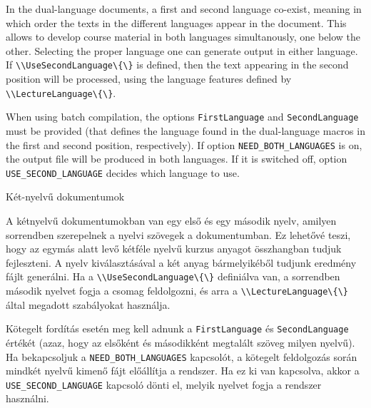 {

In the dual-language documents, a first and second language co-exist,
meaning in which order the texts in the different languages appear in the document. This allows to develop course material in both languages simultanously, one below the other. Selecting the proper language
one can generate output in either language.
If \lstinline|\\UseSecondLanguage\{\}| is defined, then the text appearing in the second position will be processed, using the 
language features defined by \lstinline|\\LectureLanguage\{\}|.

When using batch compilation, the options  \lstinline|FirstLanguage| and
\lstinline|SecondLanguage| must be provided (that defines the language
 found in the dual-language macros in the first and second position, respectively). If option \lstinline|NEED_BOTH_LANGUAGES| is on,
 the output file will be produced in both languages.
 If it is switched off, option \lstinline|USE_SECOND_LANGUAGE| decides
 which language to use.
}
{Két-nyelvű dokumentumok}
{
A kétnyelvű dokumentumokban van egy első és egy második nyelv,
amilyen sorrendben szerepelnek a nyelvi szövegek a dokumentumban.
Ez lehetővé teszi, hogy az egymás alatt levő kétféle nyelvű kurzus anyagot összhangban tudjuk fejleszteni. A nyelv kiválasztásával a két anyag bármelyikéből tudjunk eredmény fájlt generálni.
Ha a \lstinline|\\UseSecondLanguage\{\}| definiálva van, a sorrendben
második nyelvet fogja a csomag feldolgozni, és arra a \lstinline|\\LectureLanguage\{\}| által megadott szabályokat használja.

Kötegelt fordítás esetén meg kell adnunk a \lstinline|FirstLanguage| és
\lstinline|SecondLanguage| értékét (azaz, hogy az elsőként és másodikként megtalált szöveg milyen nyelvű).
Ha bekapcsoljuk a \lstinline|NEED_BOTH_LANGUAGES| kapcsolót,
a kötegelt feldolgozás során mindkét nyelvű kimenő fájt előállítja a rendszer. Ha ez ki van kapcsolva, akkor a \lstinline|USE_SECOND_LANGUAGE| kapcsoló dönti el, melyik nyelvet fogja a rendszer használni. 

}
%
%
%
%
%
